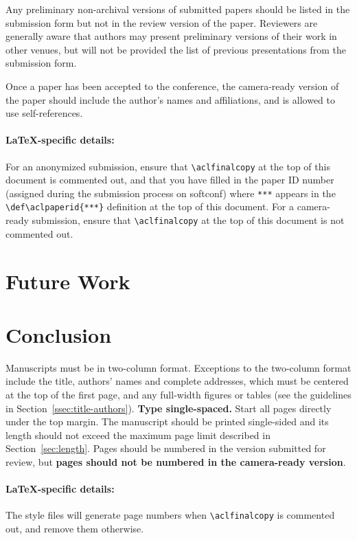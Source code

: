 \documentclass[11pt,a4paper]{article}
\begin{document}
Any preliminary non-archival versions of submitted papers should be listed in the submission form but not in the review version of the paper.
Reviewers are generally aware that authors may present preliminary versions of their work in other venues, but will not be provided the list of previous presentations from the submission form.

Once a paper has been accepted to the conference, the camera-ready version of the paper should include the author's names and affiliations, and is allowed to use self-references.

\paragraph{\LaTeX-specific details:}
For an anonymized submission, ensure that {\small\verb|\aclfinalcopy|} at the top of this document is commented out, and that you have filled in the paper ID number (assigned during the submission process on softconf) where {\small\verb|***|} appears in the {\small\verb|\def\aclpaperid{***}|} definition at the top of this document.
For a camera-ready submission, ensure that {\small\verb|\aclfinalcopy|} at the top of this document is not commented out.


\section{Future Work}


\section{Conclusion}

Manuscripts must be in two-column format.
Exceptions to the two-column format include the title, authors' names and complete addresses, which must be centered at the top of the first page, and any full-width figures or tables (see the guidelines in Section~\ref{ssec:title-authors}).
\textbf{Type single-spaced.}
Start all pages directly under the top margin.
The manuscript should be printed single-sided and its length should not exceed the maximum page limit described in Section~\ref{sec:length}.
Pages should be numbered in the version submitted for review, but \textbf{pages should not be numbered in the camera-ready version}.

\paragraph{\LaTeX-specific details:}
The style files will generate page numbers when {\small\verb|\aclfinalcopy|} is commented out, and remove them otherwise.
\end{document}

